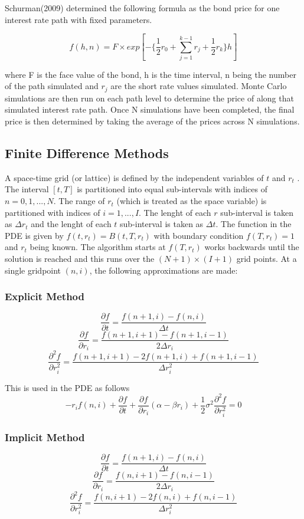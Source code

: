 \documentclass[12pt,a4paper]{article}
\begin{document}
	Schurman(2009) determined the following formula as the bond price for one interest rate path with fixed parameters.  
	
	$$f(h,n)=F\times exp[-\{\frac{1}{2}r_{0}+\sum_{j=1}^{k-1}r_{j} +\frac{1}{2}r_{k}\}h]$$
	
	where F is the face value of the bond, h is the time interval, n being the number of the path simulated and $r_{j}$ are the short rate values simulated. Monte Carlo simulations are then run on each path level to determine the price of along that simulated interest rate path. Once N simulations have been completed, the final price is then determined by taking the average of the prices across N simulations.   
	
	\subsection{Finite Difference Methods}
	\label{subsec: FD}
	A space-time grid (or lattice) is defined by the independent variables of $t$ and $r_t$ \citep{crank}. The interval $[t,T]$ is partitioned into equal sub-intervals with indices of  $n=0,1,...,N$. The range of $r_t$ (which is treated as the space variable) is partitioned with indices of $i = 1,...,I$. The lenght of each $r$ sub-interval is taken as $\Delta r_t$ and the lenght of each $t$ sub-interval is taken as $\Delta t$. The function in the PDE is given by $f(t,r_t)= B(t,T,r_t)$ with boundary condition $f(T,r_t) = 1$ and $r_t$ being known. The algorithm starts at $f(T,r_t)$ works backwards until the solution is reached and this runs over the $(N+1)\times(I+1)$ grid points. At a single gridpoint $(n,i)$, the following approximations are made:
	\subsubsection{Explicit Method}
	\label{subsubsec: Explicit}
	$$\frac{\partial f}{\partial t} = \frac{f(n+1,i) - f(n,i)}{\Delta t}$$
	$$\frac{\partial f}{\partial r_i} = \frac{f(n+1,i+1) -f(n+1,i-1)}{2 \Delta r_i}$$
	$$\frac{\partial^2 f}{\partial r_i^2} = \frac{f(n+1,i+1) - 2f(n+1,i) +f(n+1,i-1)}{\Delta r_i^2}$$
	
	This is used in the PDE as follows
	$$-r_i f(n,i)  + \frac{\partial f}{\partial t} + \frac{\partial f}{\partial r_i}(\alpha - \beta r_i) +\frac{1}{2} \sigma^2 \frac{\partial^2 f}{\partial r_i^2}  = 0 $$
	
	\subsubsection{Implicit Method}
	\label{subsubsec: Implicit}
	$$\frac{\partial f}{\partial t} = \frac{f(n+1,i) - f(n,i)}{\Delta t}$$
	$$\frac{\partial f}{\partial r_i} = \frac{f(n,i+1) -f(n,i-1)}{2 \Delta r_i}$$
	$$\frac{\partial^2 f}{\partial r_i^2} = \frac{f(n,i+1) - 2f(n,i) +f(n,i-1)}{\Delta r_i^2}$$
	
\end{document}
